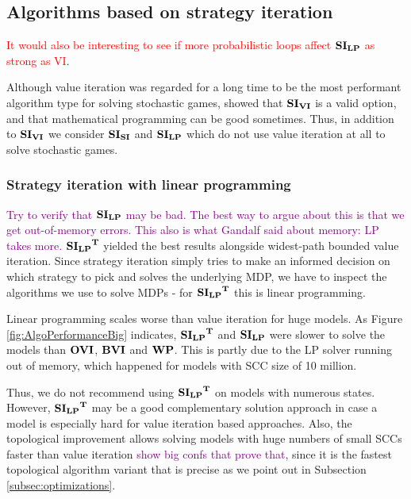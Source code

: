 \subsection{Algorithms based on strategy iteration}
\textcolor{red}{It would also be interesting to see if more probabilistic loops affect $\mathbf{SI_{LP}}$ as strong as VI}.

Although value iteration was regarded for a long time to be the most performant algorithm type for solving stochastic games, 
\cite{gandalf} showed that $\mathbf{SI_{VI}}$ is a valid option, and that mathematical programming can be good sometimes.
Thus, in addition to $\mathbf{SI_{VI}}$ we consider $\mathbf{SI_{SI}}$ and $\mathbf{SI_{LP}}$ which do not use value iteration at all to solve stochastic games.

\subsubsection*{Strategy iteration with linear programming}
\textcolor{purple}{Try to verify that $\mathbf{SI_{LP}}$ may be bad. The best way to argue about this is that we get out-of-memory errors. This also is what Gandalf said about memory: LP takes more.}
$\mathbf{\mathbf{SI_{LP}}^T}$ yielded the best results alongside widest-path bounded value iteration.
Since strategy iteration simply tries to make an informed decision on which strategy to pick and solves the underlying MDP, 
we have to inspect the algorithms we use to solve MDPs - for $\mathbf{\mathbf{SI_{LP}}^T}$ this is linear programming.

Linear programming scales worse than value iteration for huge models.
As Figure \ref{fig:AlgoPerformanceBig} indicates, $\mathbf{\mathbf{SI_{LP}}^T}$ and $\mathbf{SI_{LP}}$ were slower to solve the models than $\mathbf{OVI}$, $\mathbf{BVI}$ and $\mathbf{WP}$.
This is partly due to the LP solver running out of memory, which happened for models with SCC size of 10 million.

Thus, we do not recommend using $\mathbf{\mathbf{SI_{LP}}^T}$ on models with numerous states.
However, $\mathbf{\mathbf{SI_{LP}}^T}$ may be a good complementary solution approach in case a model is especially hard for value iteration based approaches.
Also, the topological improvement allows solving models with huge numbers of small SCCs faster than value iteration \textcolor{purple}{show big confs that prove that},
since it is the fastest topological algorithm variant that is precise as we point out in Subsection \ref{subsec:optimizations}.

